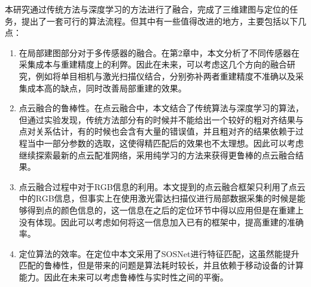 本研究通过传统方法与深度学习的方法进行了融合，完成了三维建图与定位的任务，提出了一套可行的算法流程。但其中有一些值得改进的地方，主要包括以下几点：
\begin{enumerate}
	\item 在局部建图部分对于多传感器的融合。在第2章中，本文分析了不同传感器在采集成本与重建精度上的利弊。因此在未来，可以考虑这几个方向的融合研究，例如将单目相机与激光扫描仪结合，分别弥补两者重建精度不准确以及采集成本高的缺点，同时改善局部重建的效果。
	\item 点云融合的鲁棒性。在点云融合中，本文结合了传统算法与深度学习的算法，但通过实验发现，传统方法部分有的时候并不能给出一个较好的粗对齐结果与点对关系估计，有的时候也会含有大量的错误值，并且粗对齐的结果依赖于过程当中一部分参数的选取，这使得精匹配后的效果也不太理想。因此可以考虑继续探索最新的点云配准网络，采用纯学习的方法来获得更鲁棒的点云融合结果。
	\item 点云融合过程中对于RGB信息的利用。本文提到的点云融合框架只利用了点云中的RGB信息，但事实上在使用激光雷达扫描仪进行局部数据采集的时候是能够得到点的颜色信息的，这一信息在之后的定位环节中得以应用但是在重建上没有体现。因此可以考虑如何将这一信息加入已有的框架中，提高重建的准确率。
	\item 定位算法的效率。在定位中本文采用了SOSNet进行特征匹配，这虽然能提升匹配的鲁棒性，但是带来的问题是算法耗时较长，并且依赖于移动设备的计算能力。因此在未来可以考虑鲁棒性与实时性之间的平衡。
\end{enumerate}















